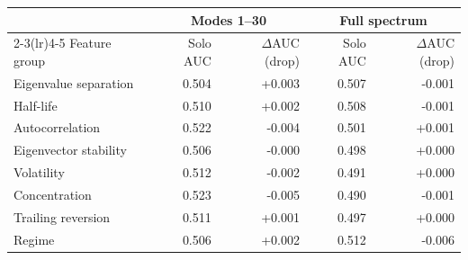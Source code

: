 \begin{tabular}{lrrrr}
\toprule
 & \multicolumn{2}{c}{Modes 1--30} & \multicolumn{2}{c}{Full spectrum} \\
\cmidrule(lr){2-3}\cmidrule(lr){4-5}
Feature group & Solo AUC & $\Delta$AUC (drop) & Solo AUC & $\Delta$AUC (drop) \\
\midrule
Eigenvalue separation & 0.504 & +0.003 & 0.507 & -0.001 \\
Half-life & 0.510 & +0.002 & 0.508 & -0.001 \\
Autocorrelation & 0.522 & -0.004 & 0.501 & +0.001 \\
Eigenvector stability & 0.506 & -0.000 & 0.498 & +0.000 \\
Volatility & 0.512 & -0.002 & 0.491 & +0.000 \\
Concentration & 0.523 & -0.005 & 0.490 & -0.001 \\
Trailing reversion & 0.511 & +0.001 & 0.497 & +0.000 \\
Regime & 0.506 & +0.002 & 0.512 & -0.006 \\
\bottomrule
\end{tabular}